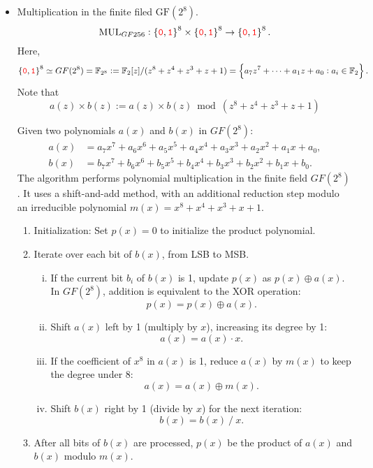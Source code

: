 \begin{itemize}
	\item Multiplication in the finite filed $\text{GF}(2^8)$. \[
	\text{MUL}_{GF256}:\set{\textcolor{red}{\texttt{0}},\textcolor{red}{\texttt{1}}}^{8}\times\set{\textcolor{red}{\texttt{0}},\textcolor{red}{\texttt{1}}}^8\to\set{\textcolor{red}{\texttt{0}},\textcolor{red}{\texttt{1}}}^8.
	\] Here, \[
	\set{\textcolor{red}{\texttt{0}},\textcolor{red}{\texttt{1}}}^{8}\simeq GF(2^8)=\mathbb{F}_{2^8}:=\mathbb{F}_2[z]/(z^8+z^4+z^3+z+1)=\set{a_7z^7+\cdots+a_1z+a_0:a_i\in\mathbb{F}_2}.
	\]
	Note that \[
	a(z)\times b(z):= a(z)\times b(z) \bmod (z^8+z^4+z^3+z+1)
	\]
	\vspace{12pt}
	\begin{note}
		Given two polynomials \( a(x) \) and \( b(x) \) in \( GF(2^8) \):
		\begin{align*}
			a(x) &= a_7x^7 + a_6x^6 + a_5x^5 + a_4x^4 + a_3x^3 + a_2x^2 + a_1x + a_0, \\
			b(x) &= b_7x^7 + b_6x^6 + b_5x^5 + b_4x^4 + b_3x^3 + b_2x^2 + b_1x + b_0.
		\end{align*}
		The algorithm performs polynomial multiplication in the finite field \( GF(2^8) \). It uses a shift-and-add method, with an additional reduction step modulo an irreducible polynomial \( m(x) = x^8 + x^4 + x^3 + x + 1 \).
		\begin{enumerate}
			\item Initialization: Set \( p(x) = 0 \) to initialize the product polynomial.
			\item Iterate over each bit of \( b(x) \), from LSB to MSB.
			\begin{enumerate}[(i)]
				\item If the current bit \( b_i \) of \( b(x) \) is 1, update \( p(x) \) as \( p(x) \oplus a(x) \). In \( GF(2^8) \), addition is equivalent to the XOR operation: \[
				p(x)=p(x)\oplus a(x).
				\]
				\item Shift \( a(x) \) left by 1 (multiply by \( x \)), increasing its degree by 1: \[
				a(x) = a(x)\cdot x.
				\]
				\item If the coefficient of \( x^8 \) in \( a(x) \) is 1, reduce \( a(x) \) by \( m(x) \) to keep the degree under 8: \[
				a(x)=a(x)\oplus m(x).
				\]
				\item Shift \( b(x) \) right by 1 (divide by \( x \)) for the next iteration: \[
				b(x) = b(x)\ /\ x.
				\] 
			\end{enumerate}
			\item After all bits of \( b(x) \) are processed, \( p(x) \) be the product of \( a(x) \) and \( b(x) \) modulo \( m(x) \).
		\end{enumerate}
	\end{note}


\end{itemize}
